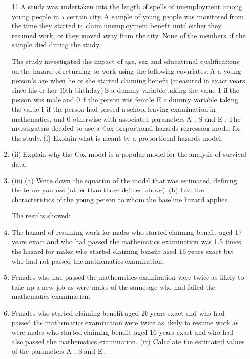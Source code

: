 \documentclass[a4paper,12pt]{article}
\begin{document}
\begin{enumerate}
11
A study was undertaken into the length of spells of unemployment among young people in a certain city. A sample of young people was monitored from the time they
started to claim unemployment benefit until either they resumed work, or they moved
away from the city. None of the members of the sample died during the study.

The study investigated the impact of age, sex and educational qualifications on the hazard of returning to work using the following covariates:
A a young person’s age when he or she started claiming benefit (measured in exact years since his or her 16th birthday)
S a dummy variable taking the value 1 if the person was male and 0 if the person was female
E a dummy variable taking the value 1 if the person had passed a school leaving examination in mathematics, and 0 otherwise
with associated parameters \beta A , \beta S and \beta E .
The investigators decided to use a Cox proportional hazards regression model for the
study.
(i) Explain what is meant by a proportional hazards model.

\item (ii) Explain why the Cox model is a popular model for the analysis of survival
data.

\item (iii) (a)
Write down the equation of the model that was estimated, defining
the terms you use (other than those defined above).
(b)
List the characteristics of the young person to whom the baseline
hazard applies.

The results showed:
\item The hazard of resuming work for males who started claiming benefit aged 17 years exact and who had passed the mathematics examination was 1.5 times the
hazard for males who started claiming benefit aged 16 years exact but who had not passed the mathematics examination.
\item Females who had passed the mathematics examination were twice as likely to take
up a new job as were males of the same age who had failed the mathematics
examination.
\item Females who started claiming benefit aged 20 years exact and who had passed the
mathematics examination were twice as likely to resume work as were males who
started claiming benefit aged 16 years exact and who had also passed the
mathematics examination.
(iv)
Calculate the estimated values of the parameters \beta A , \beta S and \beta E .


\end{enumerate}
\end{document}

